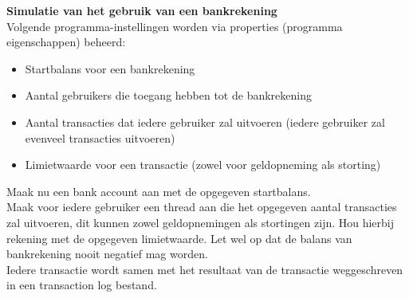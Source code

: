 \begin{oefening}
\textbf{Simulatie van het gebruik van een bankrekening}\\
Volgende programma-instellingen worden via properties (programma eigenschappen) beheerd:
\begin{itemize}
\item Startbalans voor een bankrekening
\item Aantal gebruikers die toegang hebben tot de bankrekening
\item Aantal transacties dat iedere gebruiker zal uitvoeren (iedere gebruiker zal evenveel transacties uitvoeren)
\item Limietwaarde voor een transactie (zowel voor geldopneming als storting)
\end{itemize}

Maak nu een bank account aan met de opgegeven startbalans.\\
Maak voor iedere gebruiker een thread aan die het opgegeven aantal transacties zal uitvoeren, dit kunnen zowel geldopnemingen als stortingen zijn. Hou hierbij rekening met de opgegeven limietwaarde. Let wel op dat de balans van bankrekening nooit negatief mag worden.\\
Iedere transactie wordt samen met het resultaat van de transactie weggeschreven in een transaction log bestand.
\end{oefening}

